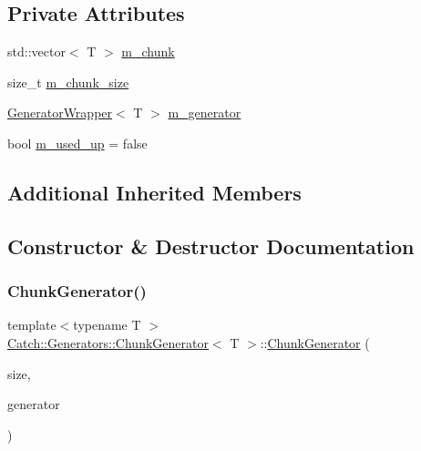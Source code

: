 \subsection*{Private Attributes}
\begin{DoxyCompactItemize}
\item 
std\+::vector$<$ T $>$ \mbox{\hyperlink{class_catch_1_1_generators_1_1_chunk_generator_ab5e382bc5be2e327331bd694a40fa827}{m\+\_\+chunk}}
\item 
size\+\_\+t \mbox{\hyperlink{class_catch_1_1_generators_1_1_chunk_generator_a222b9cd460e6d48b12f939833b1b0beb}{m\+\_\+chunk\+\_\+size}}
\item 
\mbox{\hyperlink{class_catch_1_1_generators_1_1_generator_wrapper}{Generator\+Wrapper}}$<$ T $>$ \mbox{\hyperlink{class_catch_1_1_generators_1_1_chunk_generator_aa12b90ee9d029c44528fdba6b9de17bb}{m\+\_\+generator}}
\item 
bool \mbox{\hyperlink{class_catch_1_1_generators_1_1_chunk_generator_a4a5f14d8f6c7a94e5771eb999c1ffe5a}{m\+\_\+used\+\_\+up}} = false
\end{DoxyCompactItemize}
\subsection*{Additional Inherited Members}


\subsection{Constructor \& Destructor Documentation}
\mbox{\label{class_catch_1_1_generators_1_1_chunk_generator_a50c334d00cde3166d71e9b90ebc2d2e3}} 
\subsubsection{\texorpdfstring{ChunkGenerator()}{ChunkGenerator()}}
{\footnotesize\ttfamily template$<$typename T $>$ \\
\mbox{\hyperlink{class_catch_1_1_generators_1_1_chunk_generator}{Catch\+::\+Generators\+::\+Chunk\+Generator}}$<$ T $>$\+::\mbox{\hyperlink{class_catch_1_1_generators_1_1_chunk_generator}{Chunk\+Generator}} (\begin{DoxyParamCaption}\item[{size\+\_\+t}]{size,  }\item[{\mbox{\hyperlink{class_catch_1_1_generators_1_1_generator_wrapper}{Generator\+Wrapper}}$<$ T $>$}]{generator }\end{DoxyParamCaption})\hspace{0.3cm}{\ttfamily [inline]}}



